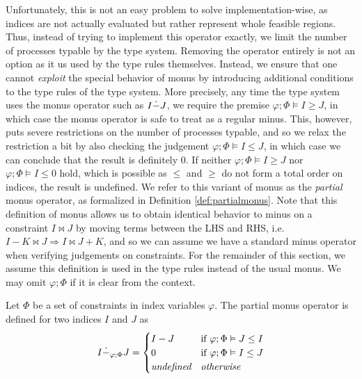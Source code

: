 Unfortunately, this is not an easy problem to solve implementation-wise, as indices are not actually evaluated but rather represent whole feasible regions. Thus, instead of trying to implement this operator exactly, we limit the number of processes typable by the type system. Removing the operator entirely is not an option as it us used by the type rules themselves. Instead, we ensure that one cannot \textit{exploit} the special behavior of monus by introducing additional conditions to the type rules of the type system. More precisely, any time the type system uses the monus operator such as $I \dot - J$, we require the premise $\varphi;\Phi \vDash I \geq J$, in which case the monus operator is safe to treat as a regular minus. This, however, puts severe restrictions on the number of processes typable, and so we relax the restriction a bit by also checking the judgement $\varphi;\Phi \vDash I \leq J$, in which case we can conclude that the result is definitely $0$. If neither $\varphi;\Phi\vDash I \geq J$ nor $\varphi;\Phi\vDash I \leq 0$ hold, which is possible as $\leq$ and $\geq$ do not form a total order on indices, the result is undefined. We refer to this variant of monus as the \textit{partial} monus operator, as formalized in Definition \ref{def:partialmonus}. Note that this definition of monus allows us to obtain identical behavior to minus on a constraint $I \bowtie J$ by moving terms between the LHS and RHS, i.e. $I - K \bowtie J \Rightarrow I \bowtie J + K$, and so we can assume we have a standard minus operator when verifying judgements on constraints. For the remainder of this section, we assume this definition is used in the type rules instead of the usual monus. We may omit $\varphi;\Phi$ if it is clear from the context.%
%
%
\begin{definition}\label{def:partialmonus}
Let $\Phi$ be a set of constraints in index variables $\varphi$. The partial monus operator is defined for two indices $I$ and $J$ as
\begin{equation*}
    I \dot -_{\varphi;\Phi} J = \begin{cases}
    I - J &\text{if $\varphi;\Phi \vDash J \leq I$}\\
    0 &\text{if $\varphi;\Phi \vDash I \leq J$}\\
    \textit{undefined} & \textit{otherwise}
    \end{cases}
\end{equation*}
\end{definition}

